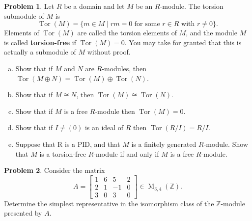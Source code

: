 \documentclass[11pt]{article}
\DeclareMathOperator{\M}{M}
\DeclareMathOperator{\Tor}{Tor}
\newcommand{\Z}{\mathbb{Z}}
\theoremstyle{definition}
\newtheorem{problem}{Problem}
\begin{document}
\begin{problem}
Let $R$ be a domain and let $M$ be an $R$-module. The torsion submodule of $M$ is 
$$\Tor(M) = \{m \in M \mid rm = 0 \text{ for some } r \in R \textrm{ with } r \neq 0 \}.$$ 
Elements of $\Tor(M)$ are called the torsion elements of $M$, and the module $M$ is called {\bf torsion-free} if $\Tor(M) = 0$. You may take for granted that this is actually a submodule of $M$ without proof.

\begin{enumerate}[a)]
\item Show that if $M$ and $N$ are $R$-modules, then $\Tor(M \oplus N) = \Tor(M) \oplus \Tor(N)$.
\item Show that if $M \cong N$, then $\Tor(M) \cong \Tor(N)$.
\item Show that if $M$ is a free $R$-module then $\Tor(M)=0$.
\item Show that if $I\neq(0)$ is an ideal of $R$ then $\Tor(R/I)=R/I$.
\item Suppose that R is a PID, and that $M$ is a finitely generated $R$-module. Show that $M$ is a torsion-free $R$-module if and only if $M$ is a free $R$-module.
\end{enumerate} 
\end{problem}





\begin{problem}
Consider the matrix 
$$A=\begin{bmatrix}
1 & 6 & 5 & 2 \\
2 & 1 & -1 & 0 \\
3 & 0 & 3 & 0
\end{bmatrix}
\in \M_{3,4}(\Z).$$
Determine the simplest representative in the isomorphism class of the $\Z$-module presented by $A$.
\end{problem}
\end{document}
